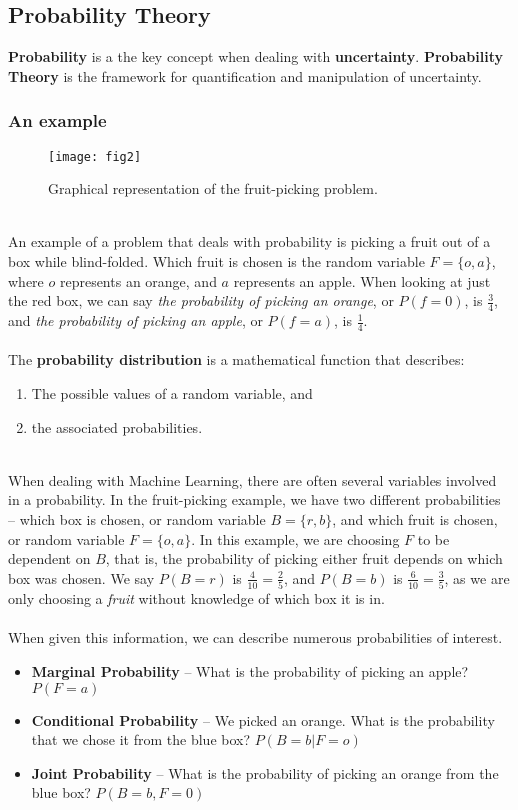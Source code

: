 \documentclass[11pt]{article} %
\begin{document}
\subsection{Probability Theory}

{\bf Probability} is a the key concept when dealing with {\bf uncertainty}. {\bf Probability Theory} is the framework for quantification and manipulation of uncertainty. \\
\subsubsection{An example}

\begin{wrapfigure}{l}{0.3\textwidth}
	\centering
		\texttt{[image: fig2]}
	\caption{Graphical representation of the fruit-picking problem.}
\end{wrapfigure}
~\\
An example of a problem that deals with probability is picking a fruit out of a box while blind-folded. Which fruit is chosen is the random variable $F = \{o,a\}$, where $o$ represents an orange, and $a$ represents an apple. When looking at just the red box, we can say {\em the probability of picking an orange}, or $P(f=0)$, is $\frac{3}{4}$, and {\em the probability of picking an apple}, or $P(f=a)$, is $\frac{1}{4}$. \\
~\\
The {\bf probability distribution} is a mathematical function that describes:
\begin{enumerate}[1. ]
\item The possible values of a random variable, and
\item the associated probabilities.
\end{enumerate}
~\\
When dealing with Machine Learning, there are often several variables involved in a probability. In the fruit-picking example, we have two different probabilities -- which box is chosen, or random variable $B = \{r,b\}$, and which fruit is chosen, or random variable $F=\{o,a\}$. In this example, we are choosing $F$ to be dependent on $B$, that is, the probability of picking either fruit depends on which box was chosen. We say $P(B=r)$ is $\frac{4}{10} = \frac{2}{5}$, and $P(B=b)$ is $\frac{6}{10} = \frac{3}{5}$, as we are only choosing a {\em fruit} without knowledge of which box it is in. \\
~\\
When given this information, we can describe numerous probabilities of interest.
\begin{itemize}
\itemsep -2pt
\item {\bf Marginal Probability} -- What is the probability of picking an apple? $P(F=a)$
\item {\bf Conditional Probability} -- We picked an orange. What is the probability that we chose it from the blue box? $P(B=b|F=o)$
\item {\bf Joint Probability} -- What is the probability of picking an orange from the blue box? $P(B=b,F=0)$
\end{itemize}
~\\
\end{document}

